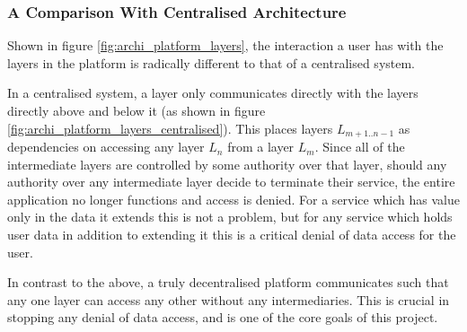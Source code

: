 \subsubsection{A Comparison With Centralised Architecture}

Shown in figure \ref{fig:archi_platform_layers}, the interaction a user has with the layers in the platform is radically different to that of a centralised system.

In a centralised system, a layer only communicates directly with the layers directly above and below it (as shown in figure \ref{fig:archi_platform_layers_centralised}). This places layers $L_{m+1..n-1}$ as dependencies on accessing any layer $L_{n}$ from a layer $L_{m}$. Since all of the intermediate layers are controlled by some authority over that layer, should any authority over any intermediate layer decide to terminate their service, the entire application no longer functions and access is denied. For a service which has value only in the data it extends this is not a problem, but for any service which holds user data in addition to extending it this is a critical denial of data access for the user. 



In contrast to the above, a truly decentralised platform communicates such that any one layer can access any other without any intermediaries. This is crucial in stopping any denial of data access, and is one of the core goals of this project.


